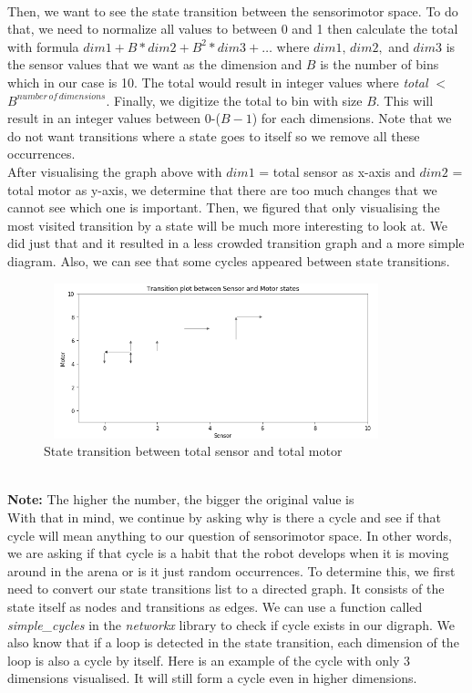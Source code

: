 \documentclass[a4paper]{article}
\begin{document}
\\\newline
Then, we want to see the state transition between the sensorimotor space. To do that, we need to normalize all values to between 0 and 1 then calculate the total with formula $dim1 + B * dim2 + B^2 * dim3 + \ldots$ where $dim1, \, dim2,$ and $ dim3$ is the sensor values that we want as the dimension and $B$ is the number of bins which in our case is 10. The total would result in integer values where \emph{total} $<$ $B^{number\, of\, dimensions}$. Finally, we digitize the total to bin with size $B$. This will result in an integer values between 0-($B-1$) for each dimensions. Note that we do not want transitions where a state goes to itself so we remove all these occurrences.
\\\newline
After visualising the graph above with $dim1$ = total sensor as x-axis and $dim2$ = total motor as y-axis, we determine that there are too much changes that we cannot see which one is important. Then, we figured that only visualising the most visited transition by a state will be much more interesting to look at. We did just that and it resulted in a less crowded transition graph and a more simple diagram. Also, we can see that some cycles appeared between state transitions. 
\begin{figure}[ht!]
	\centering
	\includegraphics[width=100mm,height=45mm]{transition.png}
	\caption{State transition between total sensor and total motor}
	\label{transition}
\end{figure}
\\
\textbf{Note:} The higher the number, the bigger the original value is
\\\newline
With that in mind, we continue by asking why is there a cycle and see if that cycle will mean anything to our question of sensorimotor space. In other words, we are asking if that cycle is a habit that the robot develops when it is moving around in the arena or is it just random occurrences. To determine this, we first need to convert our state transitions list to a directed graph. It consists of the state itself as nodes and transitions as edges. We can use a function called \emph{simple\_cycles} in the \emph{networkx} library to check if cycle exists in our digraph. We also know that if a loop is detected in the state transition, each dimension of the loop is also a cycle by itself. Here is an example of the cycle with only 3 dimensions visualised. It will still form a cycle even in higher dimensions.
\end{document}
